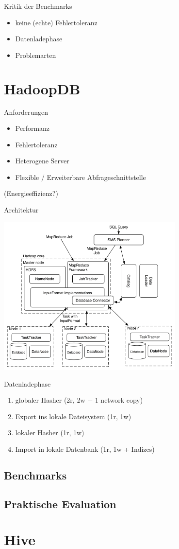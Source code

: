 \documentclass{beamer}
\begin{document}
\begin{frame}{Kritik der Benchmarks}
  \begin{itemize}
    \item keine (echte) Fehlertoleranz
    \item Datenladephase
    \item Problemarten
  \end{itemize}
\end{frame}

\section{HadoopDB}

\begin{frame}{Anforderungen}
  \begin{itemize}
    \item Performanz
    \item Fehlertoleranz
    \item Heterogene Server
    \item Flexible / Erweiterbare Abfrageschnittstelle
  \end{itemize}
  (Energieeffizienz?)
\end{frame}

\begin{frame}{Architektur}
  \begin{center}
    \includegraphics[width=0.7\textwidth]{../ausarbeitung/images/hadoopdb-arch.png}    
  \end{center}
\end{frame}

\begin{frame}{Datenladephase}
  \begin{enumerate}
    \item globaler Hasher (2r, 2w + 1 network copy)
    \item Export ins lokale Dateisystem (1r, 1w)
    \item lokaler Hasher (1r, 1w)
    \item Import in lokale Datenbank (1r, 1w + Indizes)
  \end{enumerate}
\end{frame}

\subsection{Benchmarks}
\subsection{Praktische Evaluation}
\section{Hive}
\end{document}
